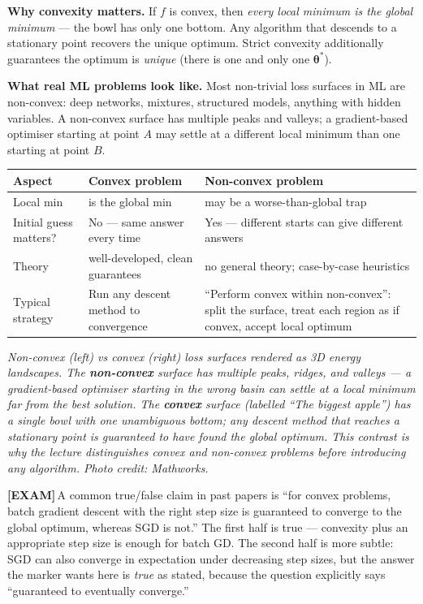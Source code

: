 \documentclass[11pt, a4paper]{article}
\newcommand{\thead}[1]{\textbf{#1}}
\newcommand{\examflag}{\textcolor{tipBd}{\textbf{[EXAM]}}\,}
\begin{document}
\textbf{Why convexity matters.} If $f$ is convex, then \emph{every local minimum is the global minimum} — the bowl has only one bottom. Any algorithm that descends to a stationary point recovers the unique optimum. Strict convexity additionally guarantees the optimum is \emph{unique} (there is one and only one $\boldsymbol\theta^*$).

\textbf{What real ML problems look like.} Most non-trivial loss surfaces in ML are non-convex: deep networks, mixtures, structured models, anything with hidden variables. A non-convex surface has multiple peaks and valleys; a gradient-based optimiser starting at point $A$ may settle at a different local minimum than one starting at point $B$.

\begin{tabularx}{\linewidth}{@{}lXX@{}}
\toprule
\thead{Aspect} & \thead{Convex problem} & \thead{Non-convex problem} \\
\midrule
Local min & is the global min          & may be a worse-than-global trap \\
Initial guess matters? & No — same answer every time & Yes — different starts can give different answers \\
Theory       & well-developed, clean guarantees & no general theory; case-by-case heuristics \\
Typical strategy & Run any descent method to convergence & ``Perform convex within non-convex'': split the surface, treat each region as if convex, accept local optimum \\
\bottomrule
\end{tabularx}

\begin{center}

\footnotesize\textit{Non-convex (left) vs convex (right) loss surfaces rendered as 3D energy landscapes. The \textbf{non-convex} surface has multiple peaks, ridges, and valleys --- a gradient-based optimiser starting in the wrong basin can settle at a local minimum far from the best solution. The \textbf{convex} surface (labelled ``The biggest apple'') has a single bowl with one unambiguous bottom; any descent method that reaches a stationary point is guaranteed to have found the global optimum. This contrast is why the lecture distinguishes convex and non-convex problems before introducing any algorithm. \textit{Photo credit: Mathworks.}}
\end{center}

\examflag{}A common true/false claim in past papers is ``for convex problems, batch gradient descent with the right step size is guaranteed to converge to the global optimum, whereas SGD is not.'' The first half is true — convexity plus an appropriate step size is enough for batch GD. The second half is more subtle: SGD can also converge in expectation under decreasing step sizes, but the answer the marker wants here is \emph{true} as stated, because the question explicitly says ``guaranteed to eventually converge.''
\end{document}
